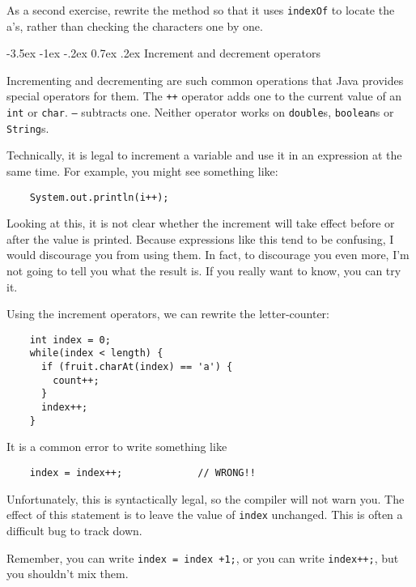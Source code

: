 \documentclass{book}
\makeatletter
\renewcommand{\section}{\@startsection 
    {section} {1} {0mm}%
    {-3.5ex \@plus -1ex \@minus -.2ex}%
    {0.7ex \@plus.2ex}%
    {\normalfont\Large\bfseries}}
\makeatother
\begin{document}

As a second exercise, rewrite the method so that it uses
{\tt indexOf} to locate the a's, rather than checking
the characters one by one.

\section{Increment and decrement operators}

Incrementing and decrementing are such common operations that
Java provides special operators for them.  The {\tt ++}
operator adds one to the current value of an {\tt int} or
{\tt char}.  {\tt --} subtracts one.  Neither operator works
on {\tt double}s, {\tt boolean}s or {\tt String}s.

Technically, it is legal to increment a variable and use it
in an expression at the same time.  For example, you might see
something like:

\begin{verbatim}
    System.out.println(i++);
\end{verbatim}
%
Looking at this, it is not clear whether the increment will
take effect before or after the value is printed.  Because
expressions like this tend to be confusing, I would discourage
you from using them.  In fact, to discourage you even more,
I'm not going to tell you what the result is.  If you really
want to know, you can try it.

Using the increment operators, we can rewrite the letter-counter:

\begin{verbatim}
    int index = 0;
    while(index < length) {
      if (fruit.charAt(index) == 'a') {
        count++;
      }
      index++;
    }
\end{verbatim}
%
It is a common error to write something like

\begin{verbatim}
    index = index++;             // WRONG!!
\end{verbatim}
%
Unfortunately, this is syntactically legal, so the compiler
will not warn you.  The effect of this statement is to leave
the value of {\tt index} unchanged.  This is often a difficult
bug to track down.

Remember, you can write {\tt index = index +1;}, or you
can write {\tt index++;}, but you shouldn't mix them.

\end{document}
